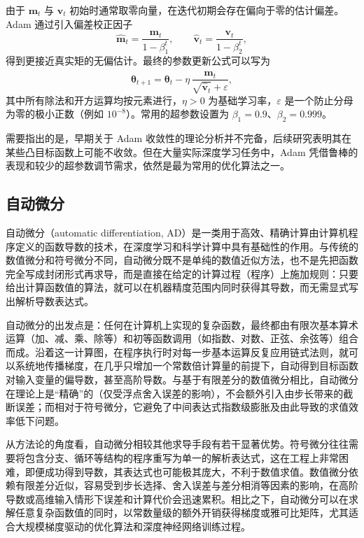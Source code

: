 由于 $\bm{m}_t$ 与 $\bm{v}_t$ 初始时通常取零向量，在迭代初期会存在偏向于零的估计偏差。Adam 通过引入偏差校正因子
\begin{equation}
    \hat{\bm{m}}_t = \frac{\bm{m}_t}{1-\beta_1^t},
    \qquad
    \hat{\bm{v}}_t = \frac{\bm{v}_t}{1-\beta_2^t},
\end{equation}
得到更接近真实矩的无偏估计。最终的参数更新公式可以写为
\begin{equation}
    \bm{\theta}_{t+1}
    = \bm{\theta}_t
    - \eta \, \frac{\hat{\bm{m}}_t}{\sqrt{\hat{\bm{v}}_t} + \varepsilon},
\end{equation}
其中所有除法和开方运算均按元素进行，$\eta > 0$ 为基础学习率，$\varepsilon$ 是一个防止分母为零的极小正数（例如 $10^{-8}$）。常用的超参数设置为 $\beta_1 = 0.9$、$\beta_2 = 0.999$。

需要指出的是，早期关于 Adam 收敛性的理论分析并不完备，后续研究表明其在某些凸目标函数上可能不收敛。但在大量实际深度学习任务中，Adam 凭借鲁棒的表现和较少的超参数调节需求，依然是最为常用的优化算法之一。

\subsection{自动微分}
自动微分（automatic differentiation, AD）是一类用于高效、精确计算由计算机程序定义的函数导数的技术，在深度学习和科学计算中具有基础性的作用。与传统的数值微分和符号微分不同，自动微分既不是单纯的数值近似方法，也不是先把函数完全写成封闭形式再求导，而是直接在给定的计算过程（程序）上施加规则：只要给出计算函数值的算法，就可以在机器精度范围内同时获得其导数，而无需显式写出解析导数表达式。

自动微分的出发点是：任何在计算机上实现的复杂函数，最终都由有限次基本算术运算（加、减、乘、除等）和初等函数调用（如指数、对数、正弦、余弦等）组合而成。沿着这一计算图，在程序执行时对每一步基本运算反复应用链式法则，就可以系统地传播梯度，在几乎只增加一个常数倍计算量的前提下，自动得到目标函数对输入变量的偏导数，甚至高阶导数。与基于有限差分的数值微分相比，自动微分在理论上是“精确”的（仅受浮点舍入误差的影响），不会额外引入由步长带来的截断误差；而相对于符号微分，它避免了中间表达式指数级膨胀及由此导致的求值效率低下问题。

从方法论的角度看，自动微分相较其他求导手段有若干显著优势。符号微分往往需要将包含分支、循环等结构的程序重写为单一的解析表达式，这在工程上非常困难，即便成功得到导数，其表达式也可能极其庞大，不利于数值求值。数值微分依赖有限差分近似，容易受到步长选择、舍入误差与差分相消等因素的影响，在高阶导数或高维输入情形下误差和计算代价会迅速累积。相比之下，自动微分可以在求解任意复杂函数值的同时，以常数量级的额外开销获得梯度或雅可比矩阵，尤其适合大规模梯度驱动的优化算法和深度神经网络训练过程。

